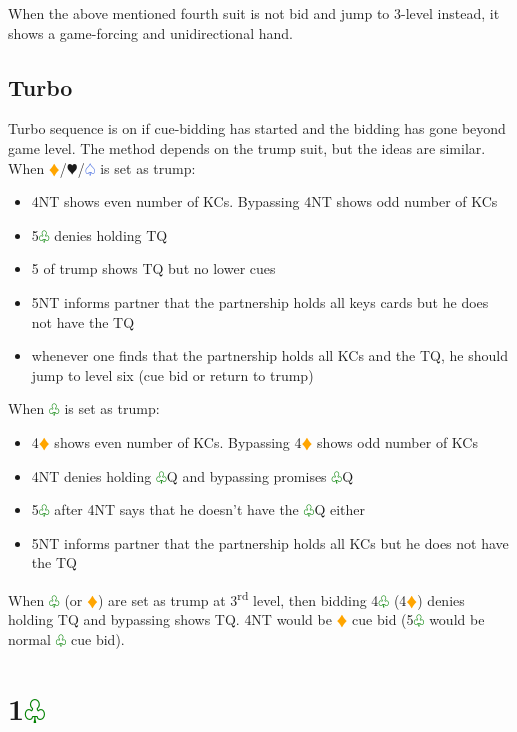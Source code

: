 \documentclass{article}
\renewcommand{\sp}{\textcolor{RoyalBlue}{$\varspade$}}
\newcommand{\he}{\textcolor{RubineRed}{$\varheart$}}
\newcommand{\di}{\textcolor{Orange}{$\vardiamond$}}
\newcommand{\cl}{\textcolor{Green}{$\varclub$}}
\newcommand{\nt}{\relsize{-1}NT\relsize{1}}
\begin{document}
When the above mentioned fourth suit is not bid and jump to 3-level instead, it shows a game-forcing and unidirectional hand.

\subsection{Turbo}
Turbo sequence is on if cue-bidding has started and the bidding has gone beyond game level. The method depends on the trump suit, but the ideas are similar. \\

When \di{}/\he/\sp{} is set as trump:
\begin{itemize}
	\itemsep0em
	\item 4\nt{} shows even number of KCs. Bypassing 4\nt{} shows odd number of KCs
	\item 5\cl{} denies holding TQ
	\item 5 of trump shows TQ but no lower cues
	\item 5\nt{} informs partner that the partnership holds all keys cards but he does not have the TQ
	\item whenever one finds that the partnership holds all KCs and the TQ, he should jump to level six (cue bid or return to trump)
\end{itemize}

When \cl{} is set as trump:
\begin{itemize}
	\itemsep0em
	\item 4\di{} shows even number of KCs. Bypassing 4\di{} shows odd number of KCs
	\item 4\nt{} denies holding \cl{}Q and bypassing promises \cl{}Q
	\item 5\cl{} after 4\nt{} says that he doesn't have the \cl{}Q either
	\item 5\nt{} informs partner that the partnership holds all KCs but he does not have the TQ
\end{itemize}

When \cl{} (or \di{}) are set as trump at 3\textsuperscript{rd} level, then bidding 4\cl{} (4\di{}) denies holding TQ and bypassing shows TQ. 4\nt{} would be \di{} cue bid (5\cl{} would be normal \cl{} cue bid).

\section{1\cl{}}
\end{document}
